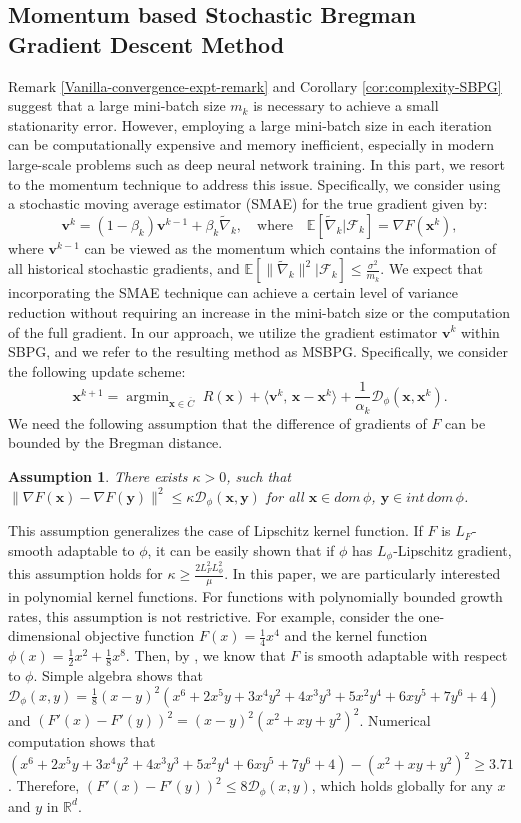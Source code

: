 \documentclass[twoside,11pt]{article}
\newcommand{\be}{\begin{equation}}
\newcommand{\ee}{\end{equation}}
\newcommand{\R}{\mathbb R}
\newcommand{\E}{\mathbb{E}}
\newcommand{\cD}{\mathcal D}
\newcommand{\cF}{\mathcal F}
\DeclareMathOperator*{\argmin}{argmin}
\def\inprod#1#2{\langle#1,\,#2\rangle}
\newtheorem{assumption}{Assumption}%
\def\vv{{\bm{v}}}
\def\vx{{\bm{x}}}
\def\vy{{\bm{y}}}
\begin{document}
\subsection{Momentum based Stochastic Bregman Gradient Descent Method}
{Remark \ref{Vanilla-convergence-expt-remark} and Corollary \ref{cor:complexity-SBPG} suggest that a large mini-batch size $m_k$ is necessary  to achieve a small stationarity error. However, employing a large mini-batch size in each iteration can be computationally expensive and memory inefficient, especially in modern large-scale problems such as deep neural network training.} In this part, we resort to the momentum technique to address this issue. Specifically, we consider using a stochastic moving average estimator (SMAE) for the true gradient given by:
\be
\vv^k=(1-\beta_k)\vv^{k-1}+\beta_k\widetilde\nabla_k,\quad \mbox{where}\quad \E[\widetilde\nabla_k|\cF_k]=\nabla F({\vx^k}),
\label{SMAE}
\ee
where $\vv^{k-1}$ can be viewed as the momentum which contains the information of all historical stochastic gradients, and $\E[\|\widetilde\nabla_k\|^2|\cF_k]\leq\frac{\sigma^2}{m_k}$. We expect that incorporating the SMAE technique can achieve a certain level of variance reduction without requiring an increase in the mini-batch size or the computation of the full gradient. In our approach, we utilize the gradient estimator $\vv^k$ within SBPG, and we refer to the resulting method as MSBPG. Specifically, we consider the following update scheme:
\begin{equation}
{\vx^{k+1}}=\argmin_{\vx\in\overline{C}}\;R(\vx)+\inprod{\vv^k}{\vx-{\vx^k}}+\frac{1}{\alpha_k}\cD_\phi(\vx,{\vx^k}).
\label{momentum-SBPG}
\end{equation}
We need the following assumption that the difference of gradients of $F$ can be bounded by the Bregman distance. 
\begin{assumption}\label{momentum-assumption}
 There exists $\kappa>0$, such that $\|\nabla F(\vx)-\nabla F(\vy)\|^2\leq\kappa \cD_\phi(\vx,\vy)$ for all $\vx\in dom\,\phi$, $\vy\in int\,dom\,\phi$.   
\end{assumption}
\begin{remark}
This assumption generalizes the case of Lipschitz kernel function. If $F$ is $L_F$-smooth adaptable to $\phi$, it can be easily shown that if $\phi$ has $L_\phi$-Lipschitz gradient, this assumption holds for $\kappa\geq\frac{2L_F^2L_\phi^2}{\mu}$. In this paper, we are particularly interested in polynomial kernel functions. For functions with polynomially bounded growth rates, this assumption is not restrictive. For example, consider the one-dimensional objective function $F(x)=\frac{1}{4}x^4$ and the kernel function $\phi(x)=\frac{1}{2}x^2+\frac{1}{8}x^8$. Then, by \cite[Proposition 2.1]{lu2018relatively}, we know that $F$ is smooth adaptable with respect to $\phi$. Simple algebra shows that $\cD_\phi(x,y)=\frac{1}{8}(x-y)^2(x^6 + 2 x^5 y + 3 x^4 y^2 + 4 x^3 y^3 + 5 x^2 y^4 + 6 x y^5 + 7 y^6 + 4)$ and $(F'(x)-F'(y))^2=(x-y)^2(x^2+xy+y^2)^2$. Numerical computation shows that $(x^6 + 2 x^5 y + 3 x^4 y^2 + 4 x^3 y^3 + 5 x^2 y^4 + 6 x y^5 + 7 y^6 + 4)-(x^2+xy+y^2)^2\geq3.71$. Therefore, $(F'(x)-F'(y))^2\leq8\cD_\phi(x,y)$, which holds globally for any $x$ and $y$ in $\R^d$. 
\end{remark}
\end{document}
